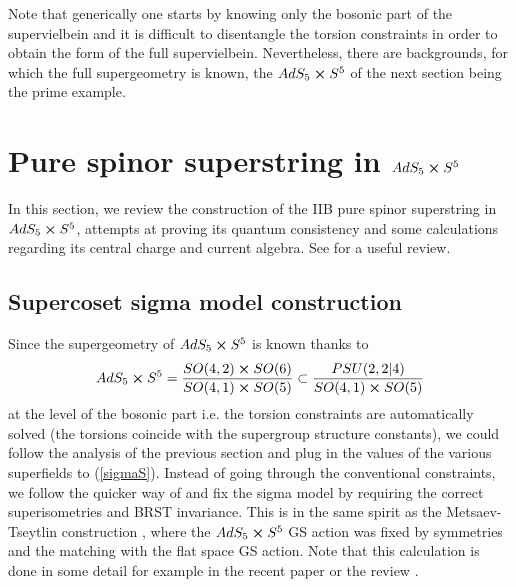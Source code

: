 \documentclass[12pt]{article}
\def\be{\begin{equation}}
\def\ee{\end{equation}}
\numberwithin{equation}{section}
\begin{document}
Note that generically one starts by knowing only the bosonic part of the supervielbein and it is difficult to disentangle the torsion constraints in order to obtain the form of the full supervielbein. Nevertheless, there are backgrounds, for which the full supergeometry is known, the $AdS_5 \cross S^5$ of the next section being the prime example.


\section{Pure spinor superstring in $AdS_5 \cross S^5$}
\label{pureAdS}
In this section, we review the construction of the IIB pure spinor superstring in $AdS_5 \cross S^5$,  attempts at proving its quantum consistency and some calculations regarding its central charge and current algebra. See \cite{Mazzucato:2011jt} for a useful review.

\subsection{Supercoset sigma model construction}
\label{fourone}
Since the supergeometry of $AdS_5 \cross S^5$ is known thanks to
\be
AdS_5 \cross S^5  = \frac{SO(4,2) \cross SO(6)}{SO(4,1)\cross SO(5)} \subset \frac{PSU(2,2|4)}{SO(4,1)\cross SO(5)}
\ee
at the level of the bosonic part i.e. the torsion constraints are automatically solved (the torsions coincide with the supergroup structure constants), we could follow the analysis of the previous section and plug in the values of the various superfields to (\ref{sigmaS}). Instead of going through the conventional constraints, we follow the quicker way of \cite{Berkovits:2002zk, Berkovits:2008ga} and fix the sigma model by requiring the correct superisometries and BRST invariance. This is in the same spirit as the  Metsaev-Tseytlin construction \cite{Metsaev:1998it}, where the $AdS_5 \cross S^5$ GS action was fixed by symmetries and the matching with the flat space GS action. Note that this calculation is done in some detail for example in the recent paper \cite{Martins:2024zud} or the review \cite{Mazzucato:2011jt}.
\end{document}
